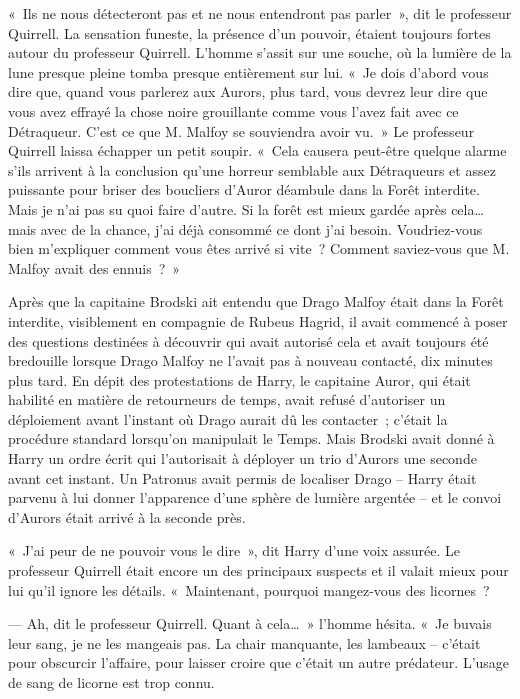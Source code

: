 «~Ils ne nous détecteront pas et ne nous entendront pas parler~», dit le professeur Quirrell. La sensation funeste, la présence d'un pouvoir, étaient toujours fortes autour du professeur Quirrell. L'homme s'assit sur une souche, où la lumière de la lune presque pleine tomba presque entièrement sur lui. «~Je dois d'abord vous dire que, quand vous parlerez aux Aurors, plus tard, vous devrez leur dire que vous avez effrayé la chose noire grouillante comme vous l'avez fait avec ce Détraqueur. C'est ce que M. Malfoy se souviendra avoir vu.~» Le professeur Quirrell laissa échapper un petit soupir. «~Cela causera peut-être quelque alarme s'ils arrivent à la conclusion qu'une horreur semblable aux Détraqueurs et assez puissante pour briser des boucliers d'Auror déambule dans la Forêt interdite. Mais je n'ai pas su quoi faire d'autre. Si la forêt est mieux gardée après cela… mais avec de la chance, j'ai déjà consommé ce dont j'ai besoin. Voudriez-vous bien m'expliquer comment vous êtes arrivé si vite~? Comment saviez-vous que M. Malfoy avait des ennuis~?~»

Après que la capitaine Brodski ait entendu que Drago Malfoy était dans la Forêt interdite, visiblement en compagnie de Rubeus Hagrid, il avait commencé à poser des questions destinées à découvrir qui avait autorisé cela et avait toujours été bredouille lorsque Drago Malfoy ne l'avait pas à nouveau contacté, dix minutes plus tard. En dépit des protestations de Harry, le capitaine Auror, qui était habilité en matière de retourneurs de temps, avait refusé d'autoriser un déploiement avant l'instant où Drago aurait dû les contacter~; c'était la procédure standard lorsqu'on manipulait le Temps. Mais Brodski avait donné à Harry un ordre écrit qui l'autorisait à déployer un trio d'Aurors une seconde avant cet instant. Un Patronus avait permis de localiser Drago -- Harry était parvenu à lui donner l'apparence d'une sphère de lumière argentée -- et le convoi d'Aurors était arrivé à la seconde près.

«~J'ai peur de ne pouvoir vous le dire~», dit Harry d'une voix assurée. Le professeur Quirrell était encore un des principaux suspects et il valait mieux pour lui qu'il ignore les détails. «~Maintenant, pourquoi mangez-vous des licornes~?

--- Ah, dit le professeur Quirrell. Quant à cela…~» l'homme hésita. «~Je buvais leur sang, je ne les mangeais pas. La chair manquante, les lambeaux -- c'était pour obscurcir l'affaire, pour laisser croire que c'était un autre prédateur. L'usage de sang de licorne est trop connu.

